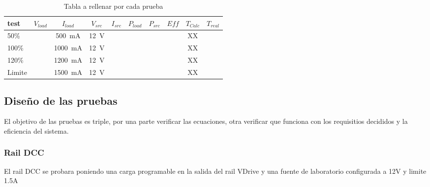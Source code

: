 \begin{table}[H]
    \centering
    \renewcommand\theadfont{\bfseries}
    \setlength{\tabcolsep}{10pt}
    \renewcommand{\arraystretch}{1.5}
    \begin{tabular}{|l|c|c|c|c|c|c|c|c|c|}
        \hline
         test & $V_{load}$ & $I_{load}$& $V_{src}$& $I_{src}$ & $P_{load}$&$P_{src}$&$Eff$ &$T_{Calc}$ &$T_{real}$ \\ \hline
			50\% & & \SI{500}{\milli\ampere}& \SI{12}{\volt}&& & & & XX &\\ \hline

100\% & & \SI{1000}{\milli\ampere}& \SI{12}{\volt}&& & & & XX &\\ \hline

120\% & & \SI{1200}{\milli\ampere}& \SI{12}{\volt}&& & & & XX &\\ \hline

Limite & & \SI{1500}{\milli\ampere}& \SI{12}{\volt}&& & & & XX &\\

			\hline

	\end{tabular}

    \caption{Tabla a rellenar por cada prueba}
    \label{tab:exampleDataLab}
\end{table}


\subsection{Diseño de las pruebas}
El objetivo de las pruebas es triple, por una parte verificar las ecuaciones, otra verificar que funciona con los requisitios decididos y la eficiencia del sistema.
\subsubsection{Rail DCC}
El rail DCC se probara poniendo una carga programable en la salida del rail VDrive y una fuente de laboratorio configurada a 12V y limite 1.5A



